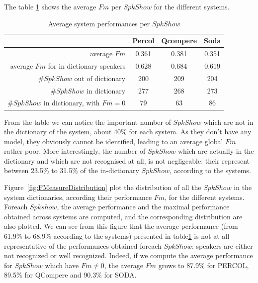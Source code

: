

The table \ref{table-spkshow-perf} shows the average $Fm$ per $SpkShow$ for the different systems.
\begin{table}[t]
\begin{center}
\begin{tabular}{r||c|c|c}
& Percol & Qcompere & Soda \\\hline\hline
average $Fm$ & 0.361 & 0.381 & 0.351\\\hline
average $Fm$ for in dictionary speakers & 0.628 & 0.684 & 0.619\\\hline
\#$SpkShow$ out of dictionary & 200 & 209 & 204 \\\hline
\#$SpkShow$ in dictionary & 277& 268 & 273\\\hline
\#$SpkShow$ in dictionary, with $Fm=0$ & 79 & 63 & 86\\\hline
\end{tabular}
\caption{Average system performances per $SpkShow$}
\label{table-spkshow-perf}
\end{center}
\end{table}

From the table we can notice the important number of $SpkShow$ which are not in the dictionary of the system, about 40\% for each system. As they don't have any model, they obviously cannot be identified, leading to an average global $Fm$ rather poor. More interestingly, the number of $SpkShow$ which are actually in the dictionary and which are not recognised at all, is not negligeable: their represent between 23.5\% to 31.5\% of the in-dictionary $SpkShow$, according to the systems.


Figure~\ref{fig:FMeasureDistribution} plot the distribution of all the $SpkShow$ in the system dictionaries, according their performance $Fm$, for the different systems. Foreach $Spkshow$, the average performance and the maximal performance obtained across systems are computed, and the corresponding distribution are also plotted. We can see from this figure that the average performance (from 61.9\% to 68.9\% according to the systems) presented in table\ref{table-spkshow-perf} is not at all representative of the performances obtained foreach $SpkShow$: speakers are either not recognized or well recognized. Indeed, if we compute the average performance for $SpkShow$ which have $Fm \neq 0$, the average $Fm$ grows to 87.9\% for PERCOL, 89.5\% for QCompere and 90.3\% for SODA. 


